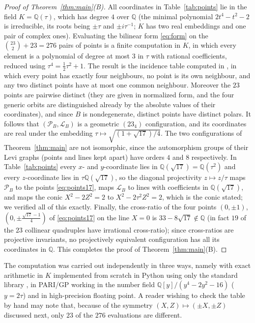 \documentclass[11pt]{article}
\theoremstyle{plain}
\theoremstyle{definition}
\newcommand{\QQ}{\mathbb{Q}}
\newcommand{\cP}{\mathcal{P}}
\newcommand{\cL}{\mathcal{L}}
\begin{document}
\begin{proof}[Proof of Theorem~\ref{thm:main}(B)]
All coordinates in Table~\ref{tab:points} lie in the field $K=\QQ(\tau)$, which has degree $4$ over $\QQ$ (the minimal polynomial $2t^4-t^2-2$ is irreducible, its roots being $\pm\tau$ and $\pm i\tau^{-1}$; $K$ has two real embeddings and one pair of complex ones).  Evaluating the bilinear form \eqref{eq:form} on the $\binom{23}{2}+23=276$ pairs of points is a finite computation in $K$, in which every element is a polynomial of degree at most $3$ in $\tau$ with rational coefficients, reduced using $\tau^4=\tfrac12\tau^2+1$.  The result is the incidence table computed in \cite{Lu26}, in which every point has exactly four neighbours, no point is its own neighbour, and any two distinct points have at most one common neighbour.  Moreover the $23$ points are pairwise distinct (they are given in normalized form, and the four generic orbits are distinguished already by the absolute values of their coordinates), and since $B$ is nondegenerate, distinct points have distinct polars.  It follows that $(\cP_B,\cL_B)$ is a geometric $(23_4)$ configuration, and its coordinates are real under the embedding $\tau\mapsto\sqrt{(1+\sqrt{17})/4}$.  The two configurations of Theorem~\ref{thm:main} are not isomorphic, since the automorphism groups of their Levi graphs (points and lines kept apart) have orders $4$ and $8$ respectively.  In Table~\ref{tab:points} every $x$- and $y$-coordinate lies in $\QQ(\sqrt{17})=\QQ(\tau^2)$ and every $z$-coordinate lies in $\tau\QQ(\sqrt{17})$, so the diagonal projectivity $z\mapsto z/\tau$ maps $\cP_B$ to the points \eqref{eq:points17}, maps $\cL_B$ to lines with coefficients in $\QQ(\sqrt{17})$, and maps the conic $X^2-2Z^2=2$ to $X^2-2\tau^2Z^2=2$, which is the conic stated; we verified all of this exactly.  Finally, the cross-ratio of the four points $(0,\pm1)$, $(0,\pm\frac{\sqrt{17}-1}{4})$ of \eqref{eq:points17} on the line $X=0$ is $33-8\sqrt{17}\notin\QQ$ (in fact $19$ of the $23$ collinear quadruples have irrational cross-ratio); since cross-ratios are projective invariants, no projectively equivalent configuration has all its coordinates in $\QQ$.  This completes the proof of Theorem~\ref{thm:main}(B).
\end{proof}

The computation was carried out independently in three ways, namely with exact arithmetic in $K$ implemented from scratch in Python using only the standard library \cite{Lu26}, in PARI/GP working in the number field $\QQ[y]/(y^4-2y^2-16)$ ($y=2\tau$) and in high-precision floating point.  A reader wishing to check the table by hand may note that, because of the symmetry $(X,Z)\mapsto(\pm X,\pm Z)$ discussed next, only $23$ of the $276$ evaluations are different.
\end{document}
